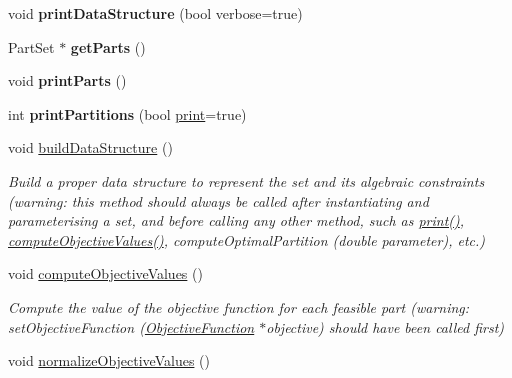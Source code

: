 \begin{DoxyCompactItemize}
\item 
\hypertarget{classGraph_aea899acebf8ff5ed6ad466acb172e081}{void {\bfseries print\-Data\-Structure} (bool verbose=true)}\label{classGraph_aea899acebf8ff5ed6ad466acb172e081}

\item 
\hypertarget{classGraph_abfe064a8ae22d82ac4e3658c53ab6b4f}{Part\-Set $\ast$ {\bfseries get\-Parts} ()}\label{classGraph_abfe064a8ae22d82ac4e3658c53ab6b4f}

\item 
\hypertarget{classGraph_a96096076e108b089d6aad5f8552d81aa}{void {\bfseries print\-Parts} ()}\label{classGraph_a96096076e108b089d6aad5f8552d81aa}

\item 
\hypertarget{classGraph_a957d9c3a0bceddbec167d2eb63c3d447}{int {\bfseries print\-Partitions} (bool \hyperlink{classGraph_a2ecf3dd3c4897aa924da8e5c221a8509}{print}=true)}\label{classGraph_a957d9c3a0bceddbec167d2eb63c3d447}

\item 
\hypertarget{classGraph_a7714e4a70a69e7d78c2479f06970c453}{void \hyperlink{classGraph_a7714e4a70a69e7d78c2479f06970c453}{build\-Data\-Structure} ()}\label{classGraph_a7714e4a70a69e7d78c2479f06970c453}

\begin{DoxyCompactList}\small\item\em Build a proper data structure to represent the set and its algebraic constraints (warning\-: this method should always be called after instantiating and parameterising a set, and before calling any other method, such as \hyperlink{classGraph_a2ecf3dd3c4897aa924da8e5c221a8509}{print()}, \hyperlink{classGraph_a237d09042d6411b64075e7b62bb5afaf}{compute\-Objective\-Values()}, compute\-Optimal\-Partition (double parameter), etc.) \end{DoxyCompactList}\item 
\hypertarget{classGraph_a237d09042d6411b64075e7b62bb5afaf}{void \hyperlink{classGraph_a237d09042d6411b64075e7b62bb5afaf}{compute\-Objective\-Values} ()}\label{classGraph_a237d09042d6411b64075e7b62bb5afaf}

\begin{DoxyCompactList}\small\item\em Compute the value of the objective function for each feasible part (warning\-: set\-Objective\-Function (\hyperlink{classObjectiveFunction}{Objective\-Function} $\ast$objective) should have been called first) \end{DoxyCompactList}\item 
\hypertarget{classGraph_ad475ae837e3a0ba750ea9e7975ff1887}{void \hyperlink{classGraph_ad475ae837e3a0ba750ea9e7975ff1887}{normalize\-Objective\-Values} ()}\label{classGraph_ad475ae837e3a0ba750ea9e7975ff1887}


\end{DoxyCompactItemize}
